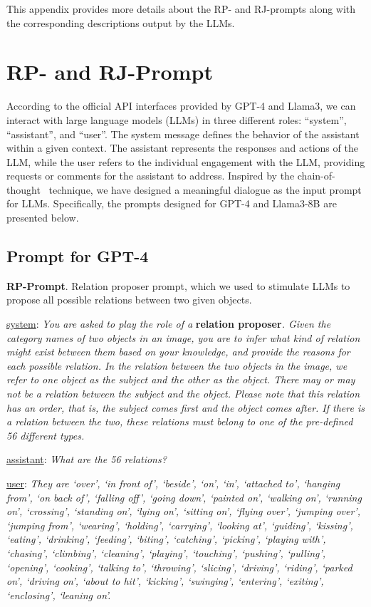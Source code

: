 \noindent This appendix provides more details about the RP- and RJ-prompts along with the corresponding descriptions output by the LLMs.


\section{RP- and RJ-Prompt}
\label{sec:prompt}

According to the official API interfaces provided by GPT-4 and Llama3, we can interact with large language models (LLMs) in three different roles: ``system'', ``assistant'', and ``user''.
The system message defines the behavior of the assistant within a given context.
The assistant represents the responses and actions of the LLM, while the user refers to the individual engagement with the LLM, providing requests or comments for the assistant to address.
Inspired by the chain-of-thought~\citep{wei2022chain} technique, we have designed a meaningful dialogue as the input prompt for LLMs.
Specifically, the prompts designed for GPT-4 and Llama3-8B are presented below.

\subsection{Prompt for GPT-4}
\label{sec:prompt_gpt}

\noindent \textbf{RP-Prompt}.
Relation proposer prompt, which we used to stimulate LLMs to propose all possible relations between two given objects.

\underline{system}: \textit{You are asked to play the role of a} \textbf{relation proposer}\textit{. Given the category names of two objects in an image, you are to infer what kind of relation might exist between them based on your knowledge, and provide the reasons for each possible relation. In the relation between the two objects in the image, we refer to one object as the subject and the other as the object. There may or may not be a relation between the subject and the object. Please note that this relation has an order, that is, the subject comes first and the object comes after. If there is a relation between the two, these relations must belong to one of the pre-defined 56 different types.}

\underline{assistant}: \textit{What are the 56 relations?}

\underline{user}: \textit{They are `over', `in front of', `beside', `on', `in', `attached to', `hanging from', `on back of', `falling off', `going down', `painted on', `walking on', `running on', `crossing', `standing on', `lying on', `sitting on', `flying over', `jumping over', `jumping from', `wearing', `holding', `carrying', `looking at', `guiding', `kissing', `eating', `drinking', `feeding', `biting', `catching', `picking', `playing with', `chasing', `climbing', `cleaning', `playing', `touching', `pushing', `pulling', `opening', `cooking', `talking to', `throwing', `slicing', `driving', `riding', `parked on', `driving on', `about to hit', `kicking', `swinging', `entering', `exiting', `enclosing', `leaning on'.}

